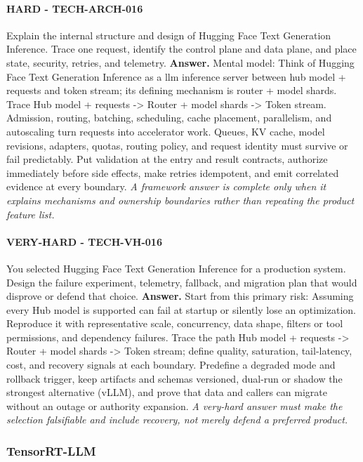 \paragraph{HARD - TECH-ARCH-016} Explain the internal structure and design of Hugging Face Text Generation Inference. Trace one request, identify the control plane and data plane, and place state, security, retries, and telemetry.
\textbf{Answer.} Mental model: Think of Hugging Face Text Generation Inference as a llm inference server between hub model + requests and token stream; its defining mechanism is router + model shards. Trace Hub model + requests -> Router + model shards -> Token stream. Admission, routing, batching, scheduling, cache placement, parallelism, and autoscaling turn requests into accelerator work. Queues, KV cache, model revisions, adapters, quotas, routing policy, and request identity must survive or fail predictably. Put validation at the entry and result contracts, authorize immediately before side effects, make retries idempotent, and emit correlated evidence at every boundary.
\textit{A framework answer is complete only when it explains mechanisms and ownership boundaries rather than repeating the product feature list.}
\paragraph{VERY-HARD - TECH-VH-016} You selected Hugging Face Text Generation Inference for a production system. Design the failure experiment, telemetry, fallback, and migration plan that would disprove or defend that choice.
\textbf{Answer.} Start from this primary risk: Assuming every Hub model is supported can fail at startup or silently lose an optimization. Reproduce it with representative scale, concurrency, data shape, filters or tool permissions, and dependency failures. Trace the path Hub model + requests -> Router + model shards -> Token stream; define quality, saturation, tail-latency, cost, and recovery signals at each boundary. Predefine a degraded mode and rollback trigger, keep artifacts and schemas versioned, dual-run or shadow the strongest alternative (vLLM), and prove that data and callers can migrate without an outage or authority expansion.
\textit{A very-hard answer must make the selection falsifiable and include recovery, not merely defend a preferred product.}
\subsubsection*{TensorRT-LLM}
